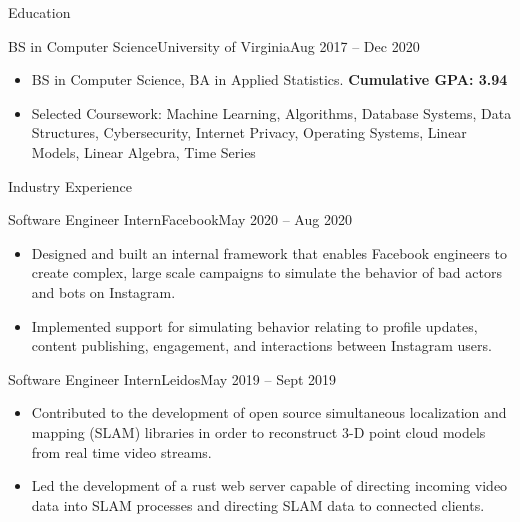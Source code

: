\documentclass[]{mcdowellcv}
\begin{document}
\makeheader


\begin{cvsection}{Education}
    \begin{cvsubsection}{BS in Computer Science}{University of Virginia}{Aug 2017 -- Dec 2020}
        \begin{itemize}
            \item BS in Computer Science, BA in Applied Statistics. \textbf{Cumulative GPA: 3.94}
            \item Selected Coursework: Machine Learning, Algorithms, Database Systems, Data Structures, Cybersecurity, Internet Privacy, Operating Systems, Linear Models, Linear Algebra, Time Series
        \end{itemize}
    \end{cvsubsection}
\end{cvsection}
\begin{cvsection}{Industry Experience}
    \begin{cvsubsection}{Software Engineer Intern}{Facebook}{May 2020 -- Aug 2020}
        \begin{itemize}%
            \item Designed and built an internal framework that enables Facebook engineers to create complex, large scale campaigns to simulate the behavior of bad actors and bots on Instagram.
            \item Implemented support for simulating behavior relating to profile updates, content publishing, engagement, and interactions between Instagram users.
        \end{itemize}
    \end{cvsubsection}

    \begin{cvsubsection}{Software Engineer Intern}{Leidos}{May 2019 -- Sept 2019}
        \begin{itemize}%
            \item Contributed to the development of open source simultaneous localization and mapping (SLAM) libraries in order to reconstruct 3-D point cloud models from real time video streams.
            \item Led the development of a rust web server capable of directing incoming video data into SLAM processes and directing SLAM data to connected clients.
        \end{itemize}
    \end{cvsubsection}
\end{cvsection}
\end{document}
